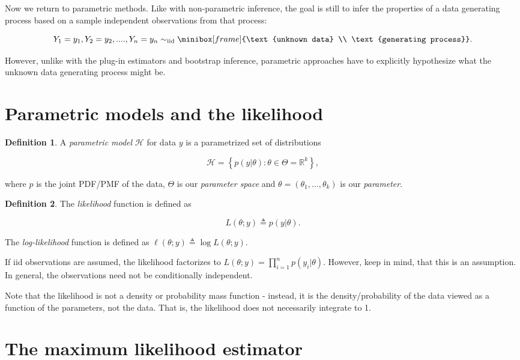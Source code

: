 \documentclass{book}
\theoremstyle{plain}%
\theoremstyle{definition}
\newtheorem{definition}{Definition}[section]
\begin{document}
Now we return to parametric methods. Like with non-parametric inference, the goal is still to infer the properties of a data generating process based on a sample independent observations from that process:

$$Y_1 = y_1, Y_2 = y_2, ...., Y_n = y_n \sim_\text{iid} \minibox[frame]{\text{unknown data} \\ \text{generating process}}.$$

However, unlike with the plug-in estimators and bootstrap inference, parametric approaches have to explicitly hypothesize what the unknown data generating process might be.


\section{Parametric models and the likelihood}

\begin{definition} A \emph{parametric model} $\mathcal{H}$ for data $y$ is a parametrized set of distributions

$$\mathcal{H} = \left\lbrace p(y|\theta) : \theta \in \Theta = \mathbb{R}^k \right\rbrace,$$

where $p$ is the joint PDF/PMF of the data, $\Theta$ is our \textit{parameter space} and $\theta = (\theta_1,...,\theta_k)$ is our \textit{parameter}.

\end{definition}

\begin{definition} The \emph{likelihood} function is defined as

$$L(\theta;y) \triangleq p(y|\theta).$$

The \emph{log-likelihood} function is defined as  $\ell(\theta;y) \triangleq \log L(\theta;y)$.
\end{definition}

If iid observations are assumed, the likelihood factorizes to $L(\theta;y) = \prod_{i=1}^n p(y_i|\theta)$. However, keep in mind, that this is an assumption. In general, the observations need not be conditionally independent.

Note that the likelihood is not a density or probability mass function - instead, it is the density/probability of the data viewed as a function of the parameters, not the data. That is, the likelihood does not necessarily integrate to 1.

\section{The maximum likelihood estimator}
\end{document}
